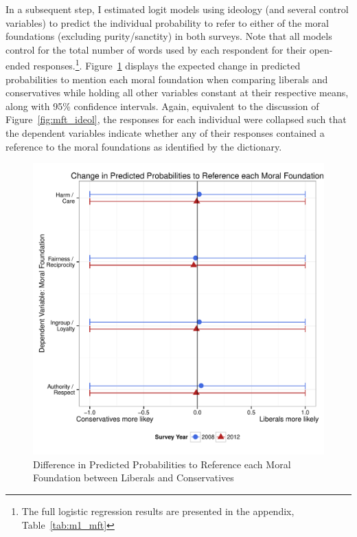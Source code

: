 \documentclass[12pt]{article}
\begin{document}
In a subsequent step, I estimated logit models using ideology (and several control variables) to predict the individual probability to refer to either of the moral foundations (excluding purity/sanctity) in both surveys. Note that all models control for the total number of words used by each respondent for their open-ended responses.\footnote{The full logistic regression results are presented in the appendix, Table~\ref{tab:m1_mft}}. Figure~\ref{fig:m1_mft} displays the expected change in predicted probabilities to mention each moral foundation when comparing liberals and conservatives while holding all other variables constant at their respective means, along with 95\% confidence intervals. Again, equivalent to the discussion of Figure~\ref{fig:mft_ideol}, the responses for each individual were collapsed such that the dependent variables indicate whether any of their responses contained a reference to the moral foundations as identified by the dictionary. 

\begin{figure}\centering
\includegraphics[scale=.6]{../calc/fig/m1_mft.pdf}
\caption{Difference in Predicted Probabilities to Reference each Moral Foundation between Liberals and Conservatives}\label{fig:m1_mft}
\end{figure}
\end{document}
